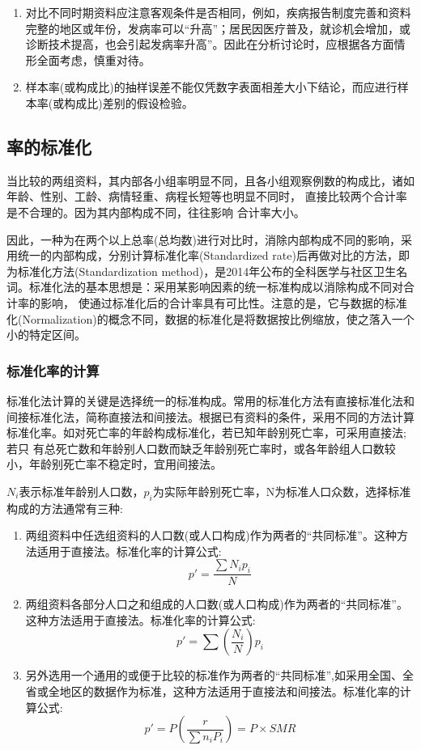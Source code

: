 \documentclass[
]{article}
\begin{document}
\begin{enumerate}
\def\labelenumi{\arabic{enumi}.}
\setcounter{enumi}{4}
\item
  对比不同时期资料应注意客观条件是否相同，例如，疾病报告制度完善和资料完整的地区或年份，发病率可以``升高''；居民因医疗普及，就诊机会增加，或诊断技术提高，也会引起发病率升高''。因此在分析讨论时，应根据各方面情形全面考虑，慎重对待。
\item
  样本率(或构成比)的抽样误差不能仅凭数字表面相差大小下结论，而应进行样本率(或构成比)差别的假设检验。
\end{enumerate}

\hypertarget{ux7387ux7684ux6807ux51c6ux5316}{%
\subsection{率的标准化}\label{ux7387ux7684ux6807ux51c6ux5316}}

当比较的两组资料，其内部各小组率明显不同，且各小组观察例数的构成比，诸如年龄、性别、工龄、病情轻重、病程长短等也明显不同时，
直接比较两个合计率是不合理的。因为其内部构成不同，往往影响 合计率大小。

因此，一种为在两个以上总率(总均数)进行对比时，消除内部构成不同的影响，采用统一的内部构成，分别计算标准化率(Standardized rate)后再做对比的方法，即为标准化方法(Standardization method)，是2014年公布的全科医学与社区卫生名词。标准化法的基本思想是：采用某影响因素的统一标准构成以消除构成不同对合计率的影响，
使通过标准化后的合计率具有可比性。注意的是，它与数据的标准化(Normalization)的概念不同，数据的标准化是将数据按比例缩放，使之落入一个小的特定区间。

\hypertarget{ux6807ux51c6ux5316ux7387ux7684ux8ba1ux7b97}{%
\subsubsection{标准化率的计算}\label{ux6807ux51c6ux5316ux7387ux7684ux8ba1ux7b97}}

标准化法计算的关键是选择统一的标准构成。常用的标准化方法有直接标准化法和间接标准化法，简称直接法和间接法。根据已有资料的条件，采用不同的方法计算标准化率。如对死亡率的年龄构成标准化，若已知年龄别死亡率，可采用直接法;若只 有总死亡数和年龄别人口数而缺乏年龄别死亡率时，或各年龄组人口数较小，年龄别死亡率不稳定时，宜用间接法。

\(N_i\)表示标准年龄别人口数，\(p_i\)为实际年龄别死亡率，N为标准人口众数，选择标准构成的方法通常有三种:

\begin{enumerate}
\def\labelenumi{\arabic{enumi}.}
\item
  两组资料中任选组资料的人口数(或人口构成)作为两者的``共同标准''。这种方法适用于直接法。标准化率的计算公式:
  \[p'=\frac{\sum N_ip_i}{N}\]
\item
  两组资料各部分人口之和组成的人口数(或人口构成)作为两者的``共同标准''。这种方法适用于直接法。标准化率的计算公式:
  \[p'=\sum\left(\frac{N_i}{N}\right)p_i\]
\item
  另外选用一个通用的或便于比较的标准作为两者的``共同标准'',如采用全国、全省或全地区的数据作为标准，这种方法适用于直接法和间接法。标准化率的计算公式:
  \[p'=P\left(\frac{r}{\sum n_iP_i}\right)=P\times SMR\]
\end{enumerate}
\end{document}
